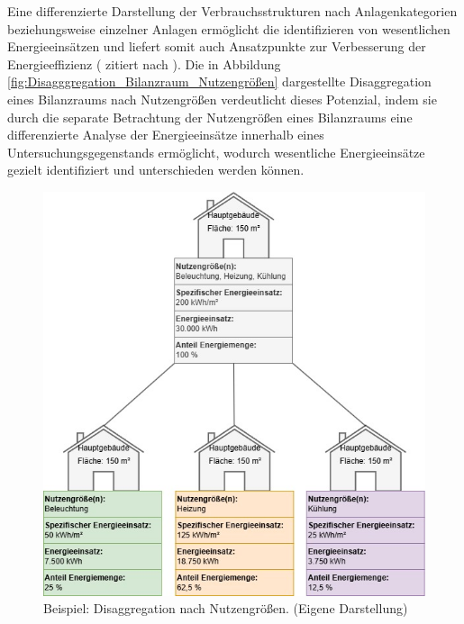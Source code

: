 Eine differenzierte Darstellung der Verbrauchsstrukturen nach Anlagenkategorien beziehungsweise einzelner Anlagen ermöglicht die identifizieren von 
wesentlichen Energieeinsätzen und liefert somit auch Ansatzpunkte zur Verbesserung der Energieeffizienz (\cite{Fink.1997} zitiert nach \cite[S. 8]{Hohnhold.2013}).
Die in Abbildung \eqref{fig:Disagggregation_Bilanzraum_Nutzengrößen} dargestellte Disaggregation eines Bilanzraums nach Nutzengrößen verdeutlicht dieses Potenzial, 
indem sie durch die separate Betrachtung der Nutzengrößen eines Bilanzraums eine differenzierte Analyse der Energieeinsätze innerhalb eines Untersuchungsgegenstands 
ermöglicht, wodurch wesentliche Energieeinsätze gezielt identifiziert und unterschieden werden können.

\begin{figure}[H]
    \centering
    \includegraphics[width=1\textwidth]{../../Ressourcen/Abbildungen/Nutzengröße_Bewertungseinheit_Zerlegt_Beispiel.jpg}
    \caption{Beispiel: Disaggregation nach Nutzengrößen. (Eigene Darstellung)}
    \label{fig:Disagggregation_Bilanzraum_Nutzengrößen_Beispiel}
\end{figure}

